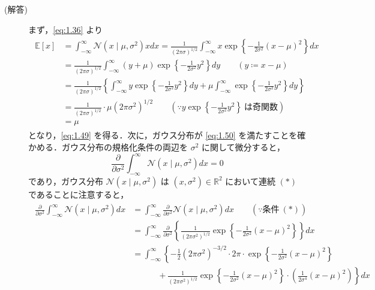 \documentclass[uplatex,a4paper,oneside,openany,dvipdfmx]{jsarticle}
\numberwithin{equation}{section}
\theoremstyle{mystyle} %
\newcommand{\BE}{\mathbb{E}}
\newcommand{\BR}{\mathbb{R}}
\newcommand{\CN}{\mathcal{N}}
\begin{document}
\begin{description}
\item[(解答)] まず，\eqref{eq:1.36} より
\begin{align}
    \begin{aligned}
        \BE[x] &= \int_{-\infty}^{\infty} \CN(x \mid \mu,\sigma^{2}) x dx = \frac{1}{(2\pi\sigma)^{1/2}} \int_{-\infty}^{\infty} x \exp{\left\{-\frac{1}{2\sigma^{2}}(x-\mu)^{2}\right\}} dx \\
        &= \frac{1}{(2\pi\sigma)^{1/2}} \int_{-\infty}^{\infty} (y+\mu) \exp{\left\{-\frac{1}{2\sigma^{2}}y^{2}\right\}} dy \qquad (y \coloneqq x-\mu) \\
        &= \frac{1}{(2\pi\sigma)^{1/2}} \left\{\int_{-\infty}^{\infty} y \exp{\left\{-\frac{1}{2\sigma^{2}}y^{2}\right\}} dy + \mu \int_{-\infty}^{\infty} \exp{\left\{-\frac{1}{2\sigma^{2}}y^{2}\right\}} dy\right\} \\
        &= \frac{1}{(2\pi\sigma)^{1/2}} \cdot \mu(2\pi\sigma^{2})^{1/2} \qquad \left(\because y \exp{\left\{-\frac{1}{2\sigma^{2}}y^{2}\right\}}\ \text{は奇関数}\right) \\
        &= \mu
    \end{aligned}
\end{align}
となり，\eqref{eq:1.49} を得る．次に，ガウス分布が \eqref{eq:1.50} を満たすことを確かめる．ガウス分布の規格化条件の両辺を $\sigma^{2}$ に関して微分すると，
\begin{equation}
    \frac{\partial}{\partial \sigma^{2}} \int_{-\infty}^{\infty} \CN(x \mid \mu,\sigma^{2}) dx = 0
\end{equation}
であり，ガウス分布 $\CN(x \mid \mu,\sigma^{2})$ は $(x,\sigma^{2}) \in \BR^{2}$ において連続 $(\ast)$ であることに注意すると，
\begin{align}
    \begin{aligned}
        \frac{\partial}{\partial \sigma^{2}} \int_{-\infty}^{\infty} \CN(x \mid \mu,\sigma^{2}) dx &= \int_{-\infty}^{\infty} \frac{\partial}{\partial \sigma^{2}} \CN(x \mid \mu,\sigma^{2}) dx \qquad (\because \text{条件}\ (\ast)) \\
        &= \int_{-\infty}^{\infty} \frac{\partial}{\partial \sigma^{2}} \left\{\frac{1}{(2\pi\sigma^{2})^{1/2}} \exp{\left\{-\frac{1}{2\sigma^{2}}(x-\mu)^{2}\right\}}\right\} dx \\
        &= \int_{-\infty}^{\infty} \left\{-\frac{1}{2} (2\pi\sigma^{2})^{-3/2} \cdot 2\pi \cdot \exp{\left\{-\frac{1}{2\sigma^{2}}(x-\mu)^{2}\right\}}\right. \\
        &\left.\qquad\quad + \frac{1}{(2\pi\sigma^{2})^{1/2}}  \exp{\left\{-\frac{1}{2\sigma^{2}}(x-\mu)^{2}\right\}} \cdot \left(\frac{1}{2\sigma^{4}}(x-\mu)^{2}\right) \right\} dx \\

\end{aligned}
\end{align}
\end{description}
\end{document}
